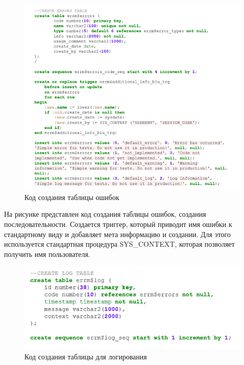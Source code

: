 \begin{figure}[ht!] 
	\center
	\includegraphics [scale=1] {my_folder/img/c3_create_errrors_table.png}
	\caption{Код создания таблицы ошибок} 
	\label{fig:c3_create_errrors_table}  
\end{figure}
\FloatBarrier

На рисунке  представлен код создания таблицы ошибок, создания последовательности. 
Создается триггер, который приводит имя ошибки к стандартному виду и добавляет мета информацию и создании. Для этого используется стандартная процедура SYS\_CONTEXT, которая позволяет получить имя пользователя. 

\begin{figure}[ht!] 
	\center
	\includegraphics [scale=1] {my_folder/img/C3_create_log_table.png}
	\caption{Код создания таблицы для логирования} 
	\label{fig:C3_create_log_table}  
\end{figure}
\FloatBarrier

